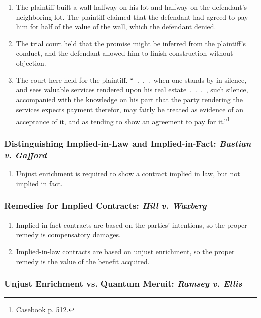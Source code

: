 \begin{enumerate}
    \item The plaintiff built a wall halfway on his lot and halfway on the 
    defendant's neighboring lot. The plaintiff claimed that the defendant had 
    agreed to pay him for half of the value of the wall, which the defendant 
    denied.
    \item The trial court held that the promise might be inferred from the 
    plaintiff's conduct, and the defendant allowed him to finish construction 
    without objection.
    \item The court here held for the plaintiff. ``~.~.~.~when one stands by 
    in silence, and sees valuable services rendered upon his real 
    estate~.~.~.~, such silence, accompanied with the knowledge on his part 
    that the party rendering the services expects payment therefor, may fairly 
    be treated as evidence of an acceptance of it, and as tending to show an 
    agreement to pay for it.''\footnote{Casebook p. 512.}
\end{enumerate}

\subsubsection{Distinguishing Implied-in-Law and Implied-in-Fact: 
\emph{Bastian v. Gafford}}

\begin{enumerate}
    \item Unjust enrichment is required to show a contract implied in law, but 
    not implied in fact.
\end{enumerate}

\subsubsection{Remedies for Implied Contracts: \emph{Hill v. Waxberg}}

\begin{enumerate}
    \item Implied-in-fact contracts are based on the parties' intentions, so 
    the proper remedy is compensatory damages.
    \item Implied-in-law contracts are based on unjust enrichment, so the 
    proper remedy is the value of the benefit acquired.
\end{enumerate}

\subsubsection{Unjust Enrichment vs. Quantum Meruit: \emph{Ramsey v. Ellis}}

